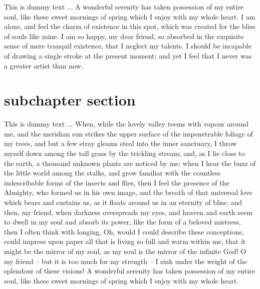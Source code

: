 \documentclass[letterpaper,oneside,11pt]{book}
\begin{document}
This is dummy text ... A wonderful serenity has taken possession of my entire soul, like these sweet mornings of spring which I enjoy with my whole heart. I am alone, and feel the charm of existence in this spot, which was created for the bliss of souls like mine. I am so happy, my dear friend, so absorbed in the exquisite sense of mere tranquil existence, that I neglect my talents. I should be incapable of drawing a single stroke at the present moment; and yet I feel that I never was a greater artist than now.


\section{subchapter section}\label{subchapter-section-1}


This is dummy text ... When, while the lovely valley teems with vapour around me, and the meridian sun strikes the upper surface of the impenetrable foliage of my trees, and but a few stray gleams steal into the inner sanctuary, I throw myself down among the tall grass by the trickling stream; and, as I lie close to the earth, a thousand unknown plants are noticed by me: when I hear the buzz of the little world among the stalks, and grow familiar with the countless indescribable forms of the insects and flies, then I feel the presence of the Almighty, who formed us in his own image, and the breath of that universal love which bears and sustains us, as it floats around us in an eternity of bliss; and then, my friend, when darkness overspreads my eyes, and heaven and earth seem to dwell in my soul and absorb its power, like the form of a beloved mistress, then I often think with longing, Oh, would I could describe these conceptions, could impress upon paper all that is living so full and warm within me, that it might be the mirror of my soul, as my soul is the mirror of the infinite God! O my friend -- but it is too much for my strength -- I sink under the weight of the splendour of these visions! A wonderful serenity has taken possession of my entire soul, like these sweet mornings of spring which I enjoy with my whole heart.
\end{document}
